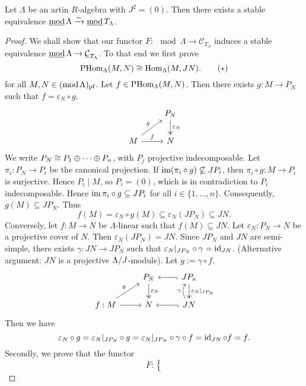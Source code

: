 
\begin{theorem}\label{3.5.4}
Let $\Lambda$ be an artin $R$-algebra with $J^2 = (0)$. Then there exists a
stable equivalence $\operatorname{\underline{\operatorname{mod}}} \Lambda \xrightarrow{\sim} \operatorname{\underline{\operatorname{mod}}} {T_\Lambda}$.
\end{theorem}
\begin{proof}
We shall show that our functor $F: \mod \Lambda \to \mathcal{C}_{T_\Lambda}$ induces a stable
equivalence $\operatorname{\underline{\operatorname{mod}}} \Lambda \to \underline{\mathcal{C}}_{T_\Lambda}$. To that end we first prove
\[
\operatorname{PHom}_\Lambda(M,N) \cong \operatorname{Hom}_\Lambda(M, J N).\tag{$*$}
\]
for all $M,N \in (\operatorname{mod} \Lambda)_{\mathrm{pf}}$. Let $f \in \operatorname{PHom}_\Lambda(M,N)$. Then there exists $g: M
\to P_N$ such that $f = \varepsilon_N \circ g$.
\[
\begin{tikzcd}
& P_N \dar["\varepsilon_N",two heads]\\
M \ar[ru, "g"] \rar["f"]& N
\end{tikzcd}
\]
We write $P_N \cong P_1 \oplus \cdots \oplus P_n$, with $P_j$ projective indecomposable. Let $\pi_i
: P_N \to P_i$ be the canonical projection. If $\operatorname{im}(\pi_i \circ g) \not\subseteq J P_i$, then
$\pi_i \circ g : M \to P_i$ is surjective. Hence $P_i \mid M$, so $P_i = (0)$, which is
in contradiction to $P_i$ indecomposable. Hence $\operatorname{im} \pi_i \circ g \subseteq J P_i$ for
all $i \in \{1, \ldots, n\}$. Consequently, $g(M) \subseteq J P_N$. Thus
\[
f(M) =\varepsilon_N \circ g(M) \subseteq \varepsilon_N(J P_N) \subseteq J N.
\]
Conversely, let $f: M \to N$ be $\Lambda$-linear such that $f(M) \subseteq J N$. Let $\varepsilon_N
: P_N \to N$ be a projective cover of $N$. Then $\varepsilon_N(J P_N) = JN$. Since $J P_N$ and $J N$ are semi-simple, there exists $\gamma: J N
\to J P_N$ such that ${\varepsilon_N}|_{J P_N} \circ \gamma = \operatorname{id}_{J N}$. (Alternative argument: $J N$ is a projective $\Lambda/J$-module). Let $g := \gamma \circ f$.
\[\begin{tikzcd}
& P_N\dar["\varepsilon_N",two heads] & JP_n \ar[l,hook] \ar[d,"\varepsilon_N|_{JP_N}",two heads] \\
f: M \rar \ar[ur, "g"]& N & JN \ar[l,hook] \ar[u,"\gamma",bend left]
\end{tikzcd}\]
Then we have
\[
\varepsilon_N \circ g = {\varepsilon_N}|_{J P_N} \circ g
= {\varepsilon_N}|_{J P_N} \circ \gamma \circ f
= \operatorname{id}_{J N} \circ f = f.
\]
Secondly, we prove that the functor
\[
\overline F:
\left\{
\]
\end{proof}
